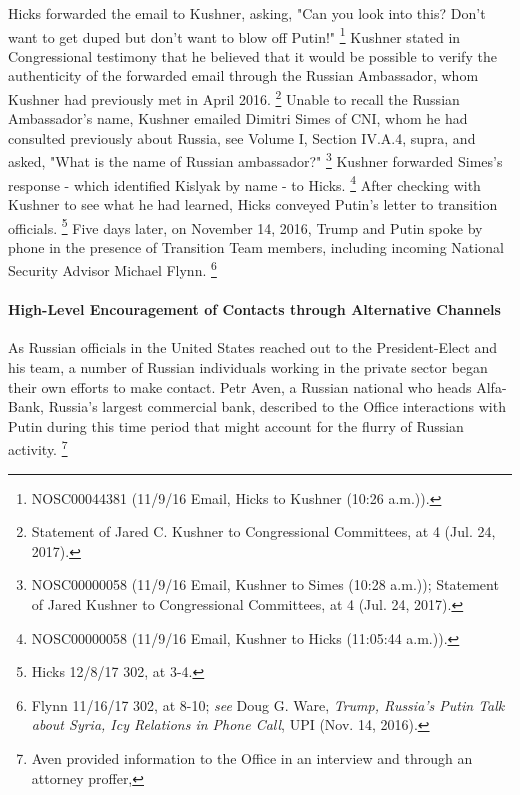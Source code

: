 Hicks forwarded the email to Kushner, asking, "Can you look into this?
Don't want to get duped but don't want to blow off Putin!"%
\footnote{NOSC00044381 (11/9/16 Email, Hicks to Kushner (10:26 a.m.)).}
Kushner stated in Congressional testimony that he believed that it would be possible to verify the authenticity of the forwarded email through the Russian Ambassador, whom Kushner had previously met in April 2016.%
\footnote{Statement of Jared C. Kushner to Congressional Committees, at 4 (Jul. 24, 2017).}
Unable to recall the Russian Ambassador's name, Kushner emailed Dimitri Simes of CNI, whom he had consulted previously about Russia, see Volume I, Section IV.A.4, supra, and asked, "What is the name of Russian ambassador?"%
\footnote{NOSC00000058 (11/9/16 Email, Kushner to Simes (10:28 a.m.));
Statement of Jared Kushner to Congressional Committees, at 4 (Jul. 24, 2017).}
Kushner forwarded Simes's response - which identified Kislyak by name - to Hicks.%
\footnote{NOSC00000058 (11/9/16 Email, Kushner to Hicks (11:05:44 a.m.)).}
After checking with Kushner to see what he had learned, Hicks conveyed Putin's letter to transition officials.%
\footnote{Hicks 12/8/17 302, at 3-4.}
Five days later, on November 14, 2016, Trump and Putin spoke by phone in the presence of Transition Team members, including incoming National Security Advisor Michael Flynn.%
\footnote{Flynn 11/16/17 302, at 8-10;
\textit{see} Doug G. Ware, \textit{Trump, Russia’s Putin Talk about Syria, Icy Relations in Phone Call}, UPI (Nov. 14, 2016).}

\paragraph{High-Level Encouragement of Contacts through Alternative Channels}

As Russian officials in the United States reached out to the President-Elect and his team, a number of Russian individuals working in the private sector began their own efforts to make contact.
Petr Aven, a Russian national who heads Alfa-Bank, Russia's largest commercial bank, described to the Office interactions with Putin during this time period that might account for the flurry of Russian activity.%
\footnote{Aven provided information to the Office in an interview and through an attorney proffer, }

